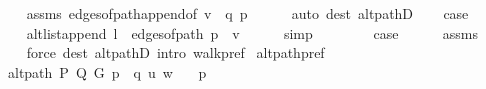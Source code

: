 \begin{isabellebody}
\ \ \ \ \isamarkupfalse%
\ assms\ edges{\isacharunderscore}{\kern0pt}of{\isacharunderscore}{\kern0pt}path{\isacharunderscore}{\kern0pt}append{\isacharunderscore}{\kern0pt}{}{\isacharbrackleft}{\kern0pt}of\ {\isachardoublequoteopen}v\ {\isacharhash}{\kern0pt}\ q{\isachardoublequoteclose}\ p{\isacharbrackright}{\kern0pt}\isanewline
\ \ \ \ \isamarkupfalse%
\ {\isacharparenleft}{\kern0pt}auto\ dest{\isacharcolon}{\kern0pt}\ alt{\isacharunderscore}{\kern0pt}pathD{\isacharparenleft}{\kern0pt}{}{\isacharparenright}{\kern0pt}{\isacharparenright}{\kern0pt}\isanewline
\ \ \isamarkupfalse%
\ {\isacharquery}{\kern0pt}case\isanewline
\ \ \ \ \isamarkupfalse%
\ alt{\isacharunderscore}{\kern0pt}list{\isacharunderscore}{\kern0pt}append{\isacharunderscore}{\kern0pt}{}{\isacharbrackleft}{\kern0pt}\ {\isacharquery}{\kern0pt}l{}{\isachardot}{\kern0pt}{}\ {\isacharequal}{\kern0pt}\ {\isachardoublequoteopen}edges{\isacharunderscore}{\kern0pt}of{\isacharunderscore}{\kern0pt}path\ {\isacharparenleft}{\kern0pt}p\ {\isacharat}{\kern0pt}\ {\isacharbrackleft}{\kern0pt}v{\isacharbrackright}{\kern0pt}{\isacharparenright}{\kern0pt}{\isachardoublequoteclose}{\isacharbrackright}{\kern0pt}\isanewline
\ \ \ \ \isamarkupfalse%
\ simp\isanewline
{}\isamarkupfalse%
\isanewline
\ \ \isamarkupfalse%
\ {}\isanewline
\ \ \isamarkupfalse%
\ {\isacharquery}{\kern0pt}case\isanewline
\ \ \ \ \isamarkupfalse%
\ assms\isanewline
\ \ \ \ \isamarkupfalse%
\ {\isacharparenleft}{\kern0pt}force\ dest{\isacharcolon}{\kern0pt}\ alt{\isacharunderscore}{\kern0pt}pathD{\isacharparenleft}{\kern0pt}{}{\isacharparenright}{\kern0pt}\ intro{\isacharcolon}{\kern0pt}\ walk{\isacharunderscore}{\kern0pt}pref{\isacharparenright}{\kern0pt}\isanewline
{}\isamarkupfalse%
%
\endisatagproof
{\isafoldproof}%
%
\isadelimproof
\isanewline
%
\endisadelimproof
\isanewline
{}\isamarkupfalse%
\ alt{\isacharunderscore}{\kern0pt}path{\isacharunderscore}{\kern0pt}pref{\isacharunderscore}{\kern0pt}{}{\isacharcolon}{\kern0pt}\isanewline
\ \ \ {\isachardoublequoteopen}alt{\isacharunderscore}{\kern0pt}path\ P\ Q\ G\ {\isacharparenleft}{\kern0pt}p\ {\isacharat}{\kern0pt}\ q{\isacharparenright}{\kern0pt}\ u\ w{\isachardoublequoteclose}\isanewline
\ \ \ {\isachardoublequoteopen}p\ {\isasymnoteq}\ {\isacharbrackleft}{\kern0pt}{\isacharbrackright}{\kern0pt}{\isachardoublequoteclose}\isanewline

\end{isabellebody}
